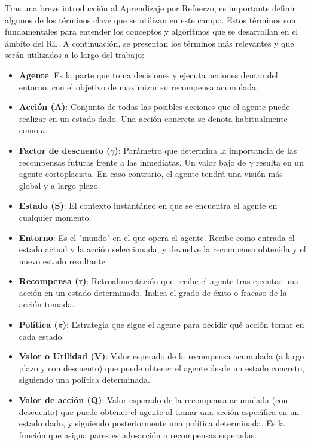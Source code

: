 Tras una breve introducción al Aprendizaje por Refuerzo, es importante definir algunos de los
términos clave que se utilizan en este campo. Estos términos son fundamentales para entender
los conceptos y algoritmos que se desarrollan en el ámbito del RL. A continuación, se presentan
los términos más relevantes y que serán utilizados a lo largo del trabajo:
\cite{wang2022nn_drl}
\begin{itemize}
    \item \textbf{Agente}: Es la parte que toma decisiones y ejecuta acciones dentro del entorno, 
    con el objetivo de maximizar su recompensa acumulada.
    \item \textbf{Acción (A)}: Conjunto de todas las posibles acciones que el agente puede 
    realizar en un estado dado. Una acción concreta se denota habitualmente como \(a\).
    \item \textbf{Factor de descuento (\(\gamma\))}: Parámetro que determina la importancia de las 
    recompensas futuras frente a las inmediatas. Un valor bajo de \(\gamma\) resulta en un agente
    cortoplacista. En caso contrario, el agente tendrá una visión más global y a largo plazo.
    \item \textbf{Estado (S)}: El contexto instantáneo en que se encuentra el agente en cualquier 
    momento.
    \item \textbf{Entorno}: Es el "mundo" en el que opera el agente. Recibe como entrada el estado 
    actual y la acción seleccionada, y devuelve la recompensa obtenida y el nuevo estado resultante.
    \item \textbf{Recompensa (r)}: Retroalimentación que recibe el agente tras ejecutar una acción 
    en un estado determinado. Indica el grado de éxito o fracaso de la acción tomada.
    \item \textbf{Política (\(\pi\))}: Estrategia que sigue el agente para decidir qué acción tomar 
    en cada estado. %
    \item \textbf{Valor o Utilidad (V)}: Valor esperado de la recompensa acumulada (a largo plazo y con 
    descuento) que puede obtener el agente desde un estado concreto, siguiendo una política 
    determinada.
    \item \textbf{Valor de acción (Q)}: Valor esperado de la recompensa acumulada (con descuento) 
    que puede obtener el agente al tomar una acción específica en un estado dado, y siguiendo 
    posteriormente una política determinada. Es la función que asigna pares estado-acción a 
    recompensas esperadas.
\end{itemize}


